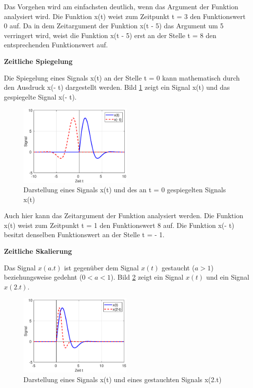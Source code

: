 \clearpage

\noindent Das Vorgehen wird am einfachsten deutlich, wenn das Argument der Funktion analysiert wird. Die Funktion x(t) weist zum Zeitpunkt t = 3 den Funktionswert 0 auf. Da in dem Zeitargument der Funktion x(t - 5) das Argument um 5 verringert wird, weist die Funktion x(t - 5) erst an der Stelle t = 8 den entsprechenden Funktionswert auf.
\bigskip

{\selectfont
\noindent\textbf{Zeitliche Spiegelung}} \smallskip

\noindent Die Spiegelung eines Signals x(t) an der Stelle t = 0 kann mathematisch durch den Ausdruck x(- t) dargestellt werden. Bild \ref{fig:Spiegelung} zeigt ein Signal x(t) und das gespiegelte Signal x(- t).

\begin{figure}[H]
  \centerline{\includegraphics[width=0.5\textwidth]{Kapitel1/Bilder/image16}}
  \caption{Darstellung eines Signals x(t) und des an t = 0 gespiegelten Signals x(t)}
  \label{fig:Spiegelung}
\end{figure}

\noindent Auch hier kann das Zeitargument der Funktion analysiert werden. Die Funktion x(t) weist zum Zeitpunkt t = 1 den Funktionswert 8 auf. Die Funktion x(- t) besitzt denselben Funktionswert an der Stelle t = - 1. 

\bigskip

{\selectfont
\noindent\textbf{Zeitliche Skalierung}} \smallskip

\noindent Das Signal $x(a.t)$ ist gegenüber dem Signal $x(t)$ gestaucht ($a \mathrm{>} 1$) beziehungsweise gedehnt ($0 \mathrm{<} a \mathrm{<} 1$). Bild \ref{fig:Stauchung} zeigt ein Signal $x(t)$ und ein Signal $x(2.t)$.

\begin{figure}[H]
  \centerline{\includegraphics[width=0.5\textwidth]{Kapitel1/Bilder/image17}}
  \caption{Darstellung eines Signals x(t) und eines gestauchten Signals x(2$.$t)}
  \label{fig:Stauchung}
\end{figure}

